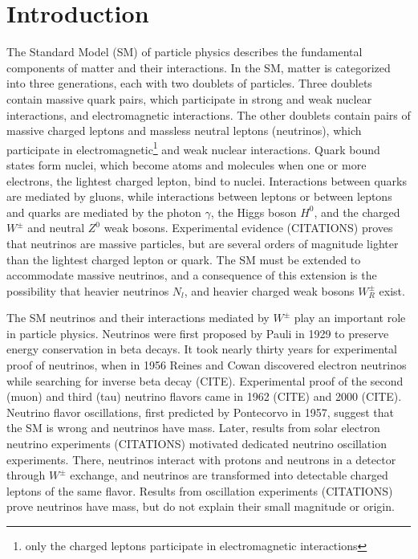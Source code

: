 \chapter{Introduction}
\label{intro_chapter}
The Standard Model (SM) of particle physics describes the fundamental components of matter and their interactions.  
In the SM, matter is categorized into three generations, each with two doublets of particles.  Three doublets 
contain massive quark pairs, which participate in strong and weak nuclear interactions, and electromagnetic interactions.  
The other doublets contain pairs of massive charged leptons and massless neutral leptons (neutrinos), which 
participate in electromagnetic\footnote{only the charged leptons participate in electromagnetic interactions} and weak nuclear interactions.  Quark bound states form nuclei, which become atoms 
and molecules when one or more electrons, the lightest charged lepton, bind to nuclei.  Interactions between quarks 
are mediated by gluons, while interactions between leptons or between leptons and quarks are mediated by the photon $\gamma$, 
the Higgs boson $H^{0}$, and the charged $W^{\pm}$ and neutral $Z^{0}$ weak bosons.  Experimental evidence (CITATIONS) 
proves that neutrinos are massive particles, but are several orders of magnitude lighter than the lightest charged 
lepton or quark.  The SM must be extended to accommodate massive neutrinos, and a consequence of this extension is the 
possibility that heavier neutrinos $N_{l}$, and heavier charged weak bosons $W^{\pm}_{R}$ exist.

The SM neutrinos and their interactions mediated by $W^{\pm}$ play an important role in particle 
physics.  Neutrinos were first proposed by Pauli in 1929 to preserve energy conservation in beta decays.  It took 
nearly thirty years for experimental proof of neutrinos, when in 1956 Reines and Cowan discovered electron neutrinos while 
searching for inverse beta decay (CITE).  Experimental proof of the second (muon) and third (tau) neutrino flavors came in 
1962 (CITE) and 2000 (CITE).  Neutrino flavor oscillations, first predicted by Pontecorvo in 1957, suggest that the SM 
is wrong and neutrinos have mass.  Later, results from solar electron neutrino experiments (CITATIONS) motivated 
dedicated neutrino oscillation experiments.  There, neutrinos interact with protons and neutrons in a detector through 
$W^{\pm}$ exchange, and neutrinos are transformed into detectable charged leptons of the same flavor.  Results from 
oscillation experiments (CITATIONS) prove neutrinos have mass, but do not explain their small magnitude or origin.

